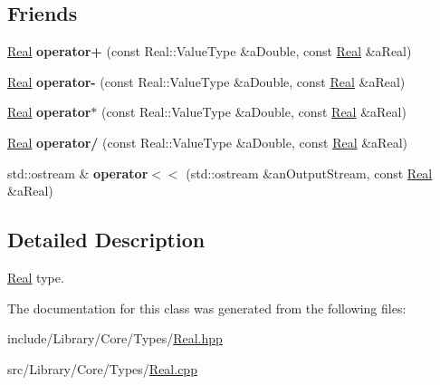 \subsection*{Friends}
\begin{DoxyCompactItemize}
\item 
\mbox{\label{classlibrary_1_1core_1_1types_1_1_real_a4e189d9163eb4d1edcc16035d78c69b6}} 
\hyperlink{classlibrary_1_1core_1_1types_1_1_real}{Real} {\bfseries operator+} (const Real\+::\+Value\+Type \&a\+Double, const \hyperlink{classlibrary_1_1core_1_1types_1_1_real}{Real} \&a\+Real)
\item 
\mbox{\label{classlibrary_1_1core_1_1types_1_1_real_a6bc7663211551195d77a7136784c382a}} 
\hyperlink{classlibrary_1_1core_1_1types_1_1_real}{Real} {\bfseries operator-\/} (const Real\+::\+Value\+Type \&a\+Double, const \hyperlink{classlibrary_1_1core_1_1types_1_1_real}{Real} \&a\+Real)
\item 
\mbox{\label{classlibrary_1_1core_1_1types_1_1_real_a7ca23417eb394573dad57b0e763b3e47}} 
\hyperlink{classlibrary_1_1core_1_1types_1_1_real}{Real} {\bfseries operator$\ast$} (const Real\+::\+Value\+Type \&a\+Double, const \hyperlink{classlibrary_1_1core_1_1types_1_1_real}{Real} \&a\+Real)
\item 
\mbox{\label{classlibrary_1_1core_1_1types_1_1_real_a98345c81e7b374941fc15cbbd6922c5d}} 
\hyperlink{classlibrary_1_1core_1_1types_1_1_real}{Real} {\bfseries operator/} (const Real\+::\+Value\+Type \&a\+Double, const \hyperlink{classlibrary_1_1core_1_1types_1_1_real}{Real} \&a\+Real)
\item 
\mbox{\label{classlibrary_1_1core_1_1types_1_1_real_a36816b0e006fd2ec3b0c53406439c7c3}} 
std\+::ostream \& {\bfseries operator$<$$<$} (std\+::ostream \&an\+Output\+Stream, const \hyperlink{classlibrary_1_1core_1_1types_1_1_real}{Real} \&a\+Real)
\end{DoxyCompactItemize}


\subsection{Detailed Description}
\hyperlink{classlibrary_1_1core_1_1types_1_1_real}{Real} type. 

The documentation for this class was generated from the following files\+:\begin{DoxyCompactItemize}
\item 
include/\+Library/\+Core/\+Types/\hyperlink{_real_8hpp}{Real.\+hpp}\item 
src/\+Library/\+Core/\+Types/\hyperlink{_real_8cpp}{Real.\+cpp}\end{DoxyCompactItemize}
